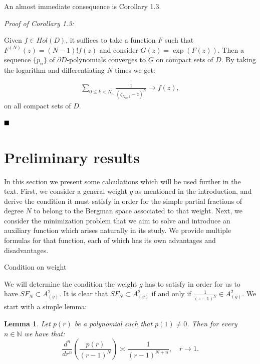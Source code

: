 \documentclass{amsart}[11pt]
\makeatletter
\newcommand{\ra}{\rightarrow}
\renewcommand\subsection{\@startsection{subsection}{2}%
\z@{-.5\linespacing\@plus-.7\linespacing}{.5\linespacing}%
{\normalfont\scshape}}
\newtheorem{lemma}[theorem]{Lemma}
\theoremstyle{definition}
\makeatother
\begin{document}
An almost immediate consequence is Corollary 1.3.

\vspace{2mm}

\textit{Proof of Corollary 1.3:}

Given $f \in Hol(D)$, it suffices to take a function $F$ such that $F^{(N)}(z) = (N-1)! f(z)$ and consider $G(z) = \exp(F(z))$. Then a sequence $\{p_n\}$ of $\partial D$-polynomials converges to $G$ on compact sets of $D$. By taking the logarithm and differentiating $N$ times we get:

\begin{gather*}
    \sum_{0 \leq k < N_n} \frac{1}{(\zeta_{N_n,k}-z)^N} \ra f(z),
\end{gather*}
on all compact sets of $D$.

$\hfill \blacksquare$

\section{Preliminary results}

In this section we present some calculations which will be used further in the text. First, we consider a general weight $g$ as mentioned in the introduction, and derive the condition it must
satisfy in order for the simple partial fractions of degree $N$ to belong to the Bergman space associated to that weight. Next, we consider the minimization problem that we aim to solve and introduce
an auxiliary function which arises naturally in its study. We provide multiple formulas for that function, each of which has its own advantages and disadvantages.

\subsection{Condition on weight}

We will determine the condition the weight $g$ has to satisfy in order for us to have $SF_N \subset A^2_{(g)}$. It
is clear that $SF_N \subset A^2_{(g)}$ if and only if $\frac{1}{(z-1)^N} \in A^2_{(g)}$. We start with a simple lemma:

\begin{lemma}
Let \( p(r) \) be a polynomial such that \( p(1) \neq 0 \). Then for every \( n \in \mathbb{N} \) we have that:
\[
\frac{d^n}{dr^n} \left( \frac{p(r)}{(r - 1)^N} \right) \asymp \frac{1}{(r - 1)^{N+n}} , \quad r \ra 1.
\]
\end{lemma}
\end{document}
